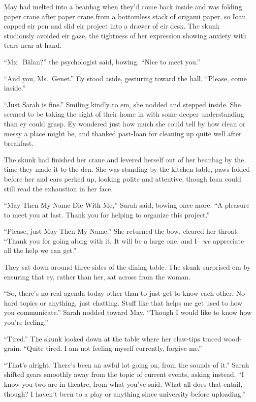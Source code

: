 May had melted into a beanbag when they'd come back inside and was folding paper crane after paper crane from a bottomless stack of origami paper, so Ioan capped eir pen and slid eir project into a drawer of eir desk. The skunk studiously avoided eir gaze, the tightness of her expression showing anxiety with tears near at hand.

``Mx.~Bălan?'' the psychologist said, bowing. ``Nice to meet you.''

``And you, Ms.~Genet.'' Ey stood aside, gesturing toward the hall. ``Please, come inside.''

``Just Sarah is fine.'' Smiling kindly to em, she nodded and stepped inside. She seemed to be taking the sight of their home in with some deeper understanding than ey could grasp. Ey wondered just how much she could tell by how clean or messy a place might be, and thanked past-Ioan for cleaning up quite well after breakfast.

The skunk had finished her crane and levered herself out of her beanbag by the time they made it to the den. She was standing by the kitchen table, paws folded before her and ears perked up, looking polite and attentive, though Ioan could still read the exhaustion in her face.

``May Then My Name Die With Me,'' Sarah said, bowing once more. ``A pleasure to meet you at last. Thank you for helping to organize this project.''

``Please, just May Then My Name.'' She returned the bow, cleared her throat. ``Thank you for going along with it. It will be a large one, and I-- \emph{we} appreciate all the help we can get.''

They sat down around three sides of the dining table. The skunk surprised em by ensuring that ey, rather than her, sat across from the woman.

``So, there's no real agenda today other than to just get to know each other. No hard topics or anything, just chatting. Stuff like that helps me get used to how you communicate.'' Sarah nodded toward May. ``Though I would like to know how you're feeling.''

``Tired.'' The skunk looked down at the table where her claw-tips traced wood-grain. ``Quite tired. I am not feeling myself currently, forgive me.''

``That's alright. There's been an awful lot going on, from the sounds of it.'' Sarah shifted gears smoothly away from the topic of current events, asking instead, ``I know you two are in theatre, from what you've said. What all does that entail, though? I haven't been to a play or anything since university before uploading.''

